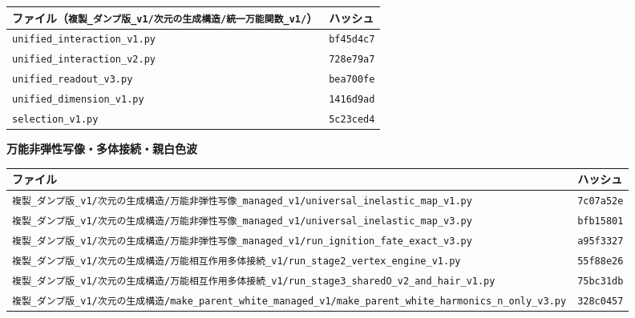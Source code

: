 \documentclass[
  10pt,
]{ltjsarticle}
\newcounter{none} %
\begin{document}
{\def\LTcaptype{none} %
\begin{longtable}[]{@{}
  >{\raggedright\arraybackslash}p{}
  >{\raggedright\arraybackslash}p{}@{}}
\toprule\noalign{}
\begin{minipage}[b]{\linewidth}\raggedright
ファイル（\texttt{複製\_ダンプ版\_v1/次元の生成構造/統一万能関数\_v1/}）
\end{minipage} & \begin{minipage}[b]{\linewidth}\raggedright
ハッシュ
\end{minipage} \\
\midrule\noalign{}
\endhead
\bottomrule\noalign{}
\endlastfoot
\texttt{unified\_interaction\_v1.py} & \texttt{bf45d4c7} \\
\texttt{unified\_interaction\_v2.py} & \texttt{728e79a7} \\
\texttt{unified\_readout\_v3.py} & \texttt{bea700fe} \\
\texttt{unified\_dimension\_v1.py} & \texttt{1416d9ad} \\
\texttt{selection\_v1.py} & \texttt{5c23ced4} \\
\end{longtable}
}

\textbf{万能非弾性写像・多体接続・親白色波}

{\def\LTcaptype{none} %
\begin{longtable}[]{@{}
  >{\raggedright\arraybackslash}p{}
  >{\raggedright\arraybackslash}p{}@{}}
\toprule\noalign{}
\begin{minipage}[b]{\linewidth}\raggedright
ファイル
\end{minipage} & \begin{minipage}[b]{\linewidth}\raggedright
ハッシュ
\end{minipage} \\
\midrule\noalign{}
\endhead
\bottomrule\noalign{}
\endlastfoot
\texttt{複製\_ダンプ版\_v1/次元の生成構造/万能非弾性写像\_managed\_v1/universal\_inelastic\_map\_v1.py}
& \texttt{7c07a52e} \\
\texttt{複製\_ダンプ版\_v1/次元の生成構造/万能非弾性写像\_managed\_v1/universal\_inelastic\_map\_v3.py}
& \texttt{bfb15801} \\
\texttt{複製\_ダンプ版\_v1/次元の生成構造/万能非弾性写像\_managed\_v1/run\_ignition\_fate\_exact\_v3.py}
& \texttt{a95f3327} \\
\texttt{複製\_ダンプ版\_v1/次元の生成構造/万能相互作用多体接続\_v1/run\_stage2\_vertex\_engine\_v1.py}
& \texttt{55f88e26} \\
\texttt{複製\_ダンプ版\_v1/次元の生成構造/万能相互作用多体接続\_v1/run\_stage3\_sharedO\_v2\_and\_hair\_v1.py}
& \texttt{75bc31db} \\
\texttt{複製\_ダンプ版\_v1/次元の生成構造/make\_parent\_white\_managed\_v1/make\_parent\_white\_harmonics\_n\_only\_v3.py}
& \texttt{328c0457} \\
\end{longtable}
}
\end{document}
